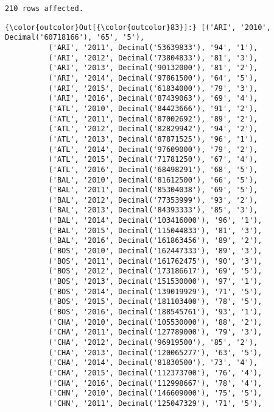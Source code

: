 \documentclass[11pt]{article}
\begin{document}
    \begin{Verbatim}[commandchars=\\\{\}]
210 rows affected.

    \end{Verbatim}

\begin{Verbatim}[commandchars=\\\{\}]
{\color{outcolor}Out[{\color{outcolor}83}]:} [('ARI', '2010', Decimal('60718166'), '65', '5'),
          ('ARI', '2011', Decimal('53639833'), '94', '1'),
          ('ARI', '2012', Decimal('73804833'), '81', '3'),
          ('ARI', '2013', Decimal('90132000'), '81', '2'),
          ('ARI', '2014', Decimal('97861500'), '64', '5'),
          ('ARI', '2015', Decimal('61834000'), '79', '3'),
          ('ARI', '2016', Decimal('87439063'), '69', '4'),
          ('ATL', '2010', Decimal('84423666'), '91', '2'),
          ('ATL', '2011', Decimal('87002692'), '89', '2'),
          ('ATL', '2012', Decimal('82829942'), '94', '2'),
          ('ATL', '2013', Decimal('87871525'), '96', '1'),
          ('ATL', '2014', Decimal('97609000'), '79', '2'),
          ('ATL', '2015', Decimal('71781250'), '67', '4'),
          ('ATL', '2016', Decimal('68498291'), '68', '5'),
          ('BAL', '2010', Decimal('81612500'), '66', '5'),
          ('BAL', '2011', Decimal('85304038'), '69', '5'),
          ('BAL', '2012', Decimal('77353999'), '93', '2'),
          ('BAL', '2013', Decimal('84393333'), '85', '3'),
          ('BAL', '2014', Decimal('103416000'), '96', '1'),
          ('BAL', '2015', Decimal('115044833'), '81', '3'),
          ('BAL', '2016', Decimal('161863456'), '89', '2'),
          ('BOS', '2010', Decimal('162447333'), '89', '3'),
          ('BOS', '2011', Decimal('161762475'), '90', '3'),
          ('BOS', '2012', Decimal('173186617'), '69', '5'),
          ('BOS', '2013', Decimal('151530000'), '97', '1'),
          ('BOS', '2014', Decimal('139019929'), '71', '5'),
          ('BOS', '2015', Decimal('181103400'), '78', '5'),
          ('BOS', '2016', Decimal('188545761'), '93', '1'),
          ('CHA', '2010', Decimal('105530000'), '88', '2'),
          ('CHA', '2011', Decimal('127789000'), '79', '3'),
          ('CHA', '2012', Decimal('96919500'), '85', '2'),
          ('CHA', '2013', Decimal('120065277'), '63', '5'),
          ('CHA', '2014', Decimal('81830500'), '73', '4'),
          ('CHA', '2015', Decimal('112373700'), '76', '4'),
          ('CHA', '2016', Decimal('112998667'), '78', '4'),
          ('CHN', '2010', Decimal('146609000'), '75', '5'),
          ('CHN', '2011', Decimal('125047329'), '71', '5'),

\end{Verbatim}
\end{document}
